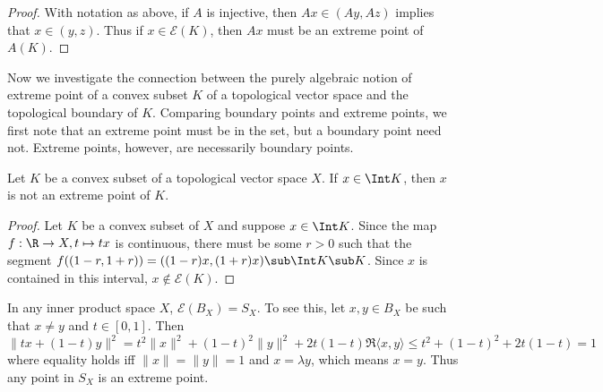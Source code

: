 \begin{proof}
With notation as above, if $A$ is injective, then $Ax\in(Ay,Az)$ implies that $x\in(y,z)$. Thus if $x\in\mathcal{E}(K)$, then $Ax$ must be an extreme point of $A(K)$.
\end{proof}
Now we investigate the connection between the purely algebraic notion of extreme point of a convex subset $K$ of a topological vector space and the topological boundary of $K$. Comparing boundary points and extreme points, we first note that an extreme point must be in the set, but a boundary point need not. Extreme points, however, are necessarily boundary points.
\begin{proposition}\label{TVS extreme point in boundary}
Let $K$ be a convex subset of a topological vector space $X$. If $x\in\Int K$, then $x$ is not an extreme point of $K$.
\end{proposition}
\begin{proof}
Let $K$ be a convex subset of $X$ and suppose $x\in\Int K$. Since the map $f:\R\to X,t\mapsto tx$ is continuous, there must be some $r>0$ such that the segment $f((1-r,1+r))=((1-r)x,(1+r)x)\sub\Int K\sub K$. Since $x$ is contained in this interval, $x\notin\mathcal{E}(K)$.
\end{proof}
\begin{example}
In any inner product space $X$, $\mathcal{E}(B_X)=S_X$. To see this, let $x,y\in B_X$ be such that $x\neq y$ and $t\in[0,1]$. Then
\[\|tx+(1-t)y\|^2=t^2\|x\|^2+(1-t)^2\|y\|^2+2t(1-t)\Re\langle x,y\rangle\leq t^2+(1-t)^2+2t(1-t)=1\]
where equality holds iff $\|x\|=\|y\|=1$ and $x=\lambda y$, which means $x=y$. Thus any point in $S_X$ is an extreme point.
\end{example}
